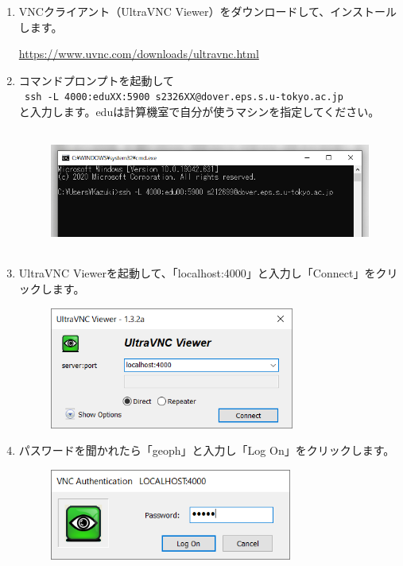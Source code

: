 \documentclass{jarticle}
\begin{document}
\begin{enumerate}
  \item VNCクライアント（UltraVNC Viewer）をダウンロードして、インストールします。
  \begin{center}
    \url{https://www.uvnc.com/downloads/ultravnc.html}
  \end{center}
  \item コマンドプロンプトを起動して\\
    \verb| ssh -L 4000:eduXX:5900 s2326XX@dover.eps.s.u-tokyo.ac.jp |  \\
  と入力します。eduは計算機室で自分が使うマシンを指定してください。
  \begin{figure}[H]
    \centering
    \includegraphics[height=4cm,pagebox=cropbox,clip]{fig/VNCWin1.png}
  \end{figure}
  \item UltraVNC Viewerを起動して、「localhost:4000」と入力し「Connect」をクリックします。
  \begin{figure}[H]
    \centering
    \includegraphics[height=4cm,pagebox=cropbox,clip]{fig/VNCWin2.png}
  \end{figure}
  \item パスワードを聞かれたら「geoph」と入力し「Log On」をクリックします。
  \begin{figure}[H]
    \centering
    \includegraphics[height=3cm,pagebox=cropbox,clip]{fig/VNCWin3.png}

\end{figure}
\end{enumerate}
\end{document}
